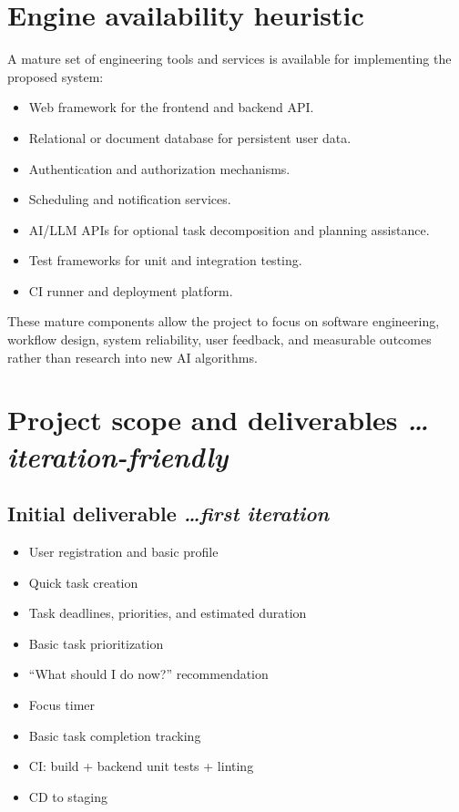 \documentclass[11pt,a4paper]{article}
\newcommand{\BvrHint}[1]{%
  {\normalfont\normalsize\itshape\hfill #1}}
\begin{document}
\section{Engine availability heuristic}

A mature set of engineering tools and services is available for implementing
the proposed system:

\begin{itemize}[leftmargin=0.7cm]
    \item Web framework for the frontend and backend API.
    \item Relational or document database for persistent user data.
    \item Authentication and authorization mechanisms.
    \item Scheduling and notification services.
    \item AI/LLM APIs for optional task decomposition and planning assistance.
    \item Test frameworks for unit and integration testing.
    \item CI runner and deployment platform.
\end{itemize}

These mature components allow the project to focus on software engineering,
workflow design, system reliability, user feedback, and measurable outcomes
rather than research into new AI algorithms.

\section{Project scope and deliverables %
\BvrHint{\ldots iteration-friendly}}

\subsection{Initial deliverable %
\BvrHint{\ldots first iteration}}

\begin{itemize}[leftmargin=0.7cm]
    \item User registration and basic profile
    \item Quick task creation
    \item Task deadlines, priorities, and estimated duration
    \item Basic task prioritization
    \item ``What should I do now?'' recommendation
    \item Focus timer
    \item Basic task completion tracking
    \item CI: build + backend unit tests + linting
    \item CD to staging
\end{itemize}
\end{document}
